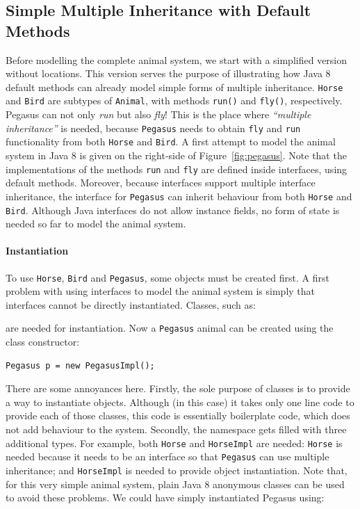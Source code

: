 \subsection{Simple Multiple Inheritance with Default
  Methods}\label{sec:simple}

Before modelling the complete animal system, we  start with a
simplified version without locations. This version serves the purpose of illustrating how 
Java 8 default methods can already model simple forms of multiple inheritance.
\texttt{Horse} and \texttt{Bird} are subtypes
of \texttt{Animal}, with methods \texttt{run()} and \texttt{fly()},
respectively. Pegasus can not only \emph{run} but also \emph{fly}! This is the
place where \emph{``multiple inheritance''} is needed, because
\texttt{Pegasus} needs to obtain \texttt{fly} and \texttt{run}
functionality from both \texttt{Horse} and \texttt{Bird}.
A first attempt to model the animal system in Java 8 is given on the right-side 
of Figure~\ref{fig:pegasus}.
Note that the implementations of the methods \texttt{run}
and \texttt{fly} are defined inside interfaces, using default
methods. Moreover, because interfaces support multiple interface
inheritance, the interface for \texttt{Pegasus} can inherit behaviour
from both \texttt{Horse} and \texttt{Bird}. Although Java interfaces
do not allow instance fields, no form of state is needed so far to
model the animal system. 

\paragraph{Instantiation}
To use \texttt{Horse}, \texttt{Bird} and \texttt{Pegasus}, some
objects must be created first. A first problem with using
interfaces to model the animal system is simply that interfaces 
cannot be directly instantiated. Classes, such as:


\noindent are needed for instantiation. Now a \texttt{Pegasus} animal can be created
using the class constructor:

\begin{lstlisting}
Pegasus p = new PegasusImpl();
\end{lstlisting}

\noindent There are some annoyances here. Firstly, the sole
purpose of classes is to provide a way to instantiate
objects. Although (in this case) it takes only one line code to
provide each of those classes, this code is essentially boilerplate
code, which does not add behaviour to the system. Secondly, 
the namespace gets filled with three additional types. For example, 
both \texttt{Horse} and \texttt{HorseImpl} are needed: \texttt{Horse}
is needed because it needs to be an interface so that \texttt{Pegasus}
can use multiple inheritance; and \texttt{HorseImpl} is needed to
provide object instantiation. 
Note that, for this very simple animal system, plain Java 8 anonymous
classes can be used to avoid these problems.  We could have simply
instantiated Pegasus using:

